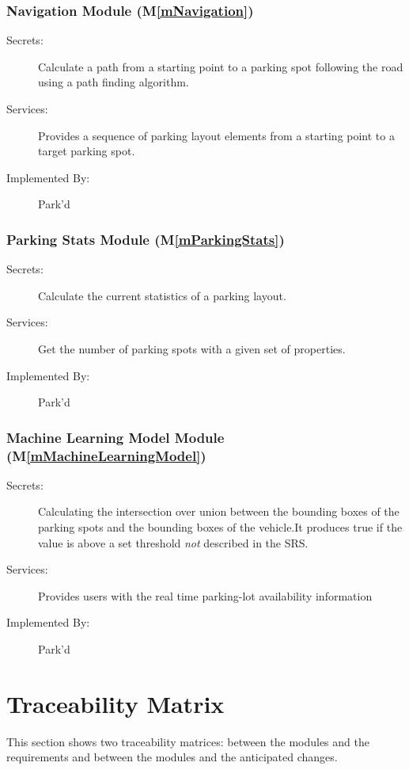 \documentclass[12pt, titlepage]{article}
\newcommand{\mref}[1]{M\ref{#1}}
\begin{document}
\subsubsection{Navigation Module (\mref{mNavigation})}
\begin{description}
\item[Secrets:] Calculate a path from a starting point to a parking spot
following the road using a path finding algorithm.
\item[Services:] Provides a sequence of parking layout elements from a starting
point to a target parking spot.
\item[Implemented By:] Park'd
\end{description}

\subsubsection{Parking Stats Module (\mref{mParkingStats})}
\begin{description}
\item[Secrets:] Calculate the current statistics of a parking layout.
\item[Services:] Get the number of parking spots with a given set of properties.
\item[Implemented By:] Park'd
\end{description}

\subsubsection{Machine Learning Model Module (\mref{mMachineLearningModel})}
\begin{description}
    \item[Secrets:] Calculating the intersection over union between the bounding
  boxes of the parking spots and the bounding boxes of the vehicle.It produces
  true if the value is above a set threshold \emph{not} described in the SRS.
\item[Services:] Provides users with the real time parking-lot availability
information 
\item[Implemented By:] Park'd
\end{description}

\section{Traceability Matrix} \label{SecTM}

This section shows two traceability matrices: between the modules and the
requirements and between the modules and the anticipated changes.
\end{document}
